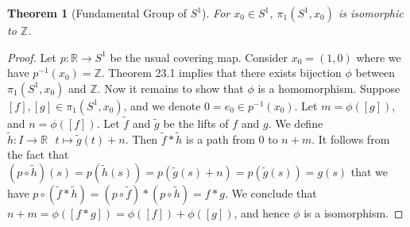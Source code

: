 \documentclass[11pt]{book}
\theoremstyle{break}
\theoremstyle{break}
\newtheorem{thm}{Theorem}[section]
\newcommand{\R}{\mathbb{R}}
\newcommand{\Z}{\mathbb{Z}}
\newcommand{\that}[1]{\widetilde{#1}}
\begin{document}
\begin{thm}[Fundamental Group of $S^1$]
For $x_0 \in S^1$, $\pi_1 (S^1, x_0) $ is isomorphic to $\Z$.
\end{thm}
\begin{proof}
Let $p:\R \to S^1$ be the usual covering map. Consider $x_0 = (1,0)$ where we have $p^{-1}(x_0) = \Z$. Theorem 23.1 implies that there exists bijection $\phi$ between $\pi_1(S^1, x_0)$ and $\Z$. Now it remains to show that $\phi$ is a homomorphism. Suppose $[f],[g] \in \pi_1(S^1,x_0)$, and we denote $0 = e_0 \in p^{-1}(x_0)$. Let $m = \phi([g])$, and $n = \phi([f])$. Let $\that{f}$ and $\that{g}$ be the lifts of $f$ and $g$. We define $\that{h}:I \to \R \ \ \ t\mapsto \that{g}(t) +n$. Then $\that{f} * \that{h}$ is a path from $0$ to $n+m$. It follows from the fact that $(p\circ \that{h})(s) = p(\that{h}(s)) = p(\that{g}(s)+n) = p(\that{g}(s)) = g(s)$ that we have $p\circ (\that{f}*\that{h}) = ( p\circ \that{f}) *(p \circ \that{h})= f*g$. We conclude that $n+m = \phi([f*g]) = \phi([f]) + \phi([g])$, and hence $\phi$ is a isomorphism. 
\end{proof}

\end{document}
